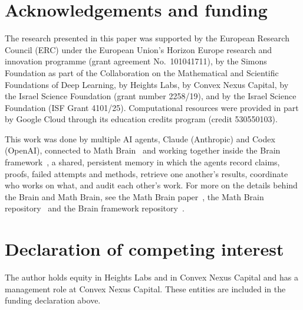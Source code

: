 \documentclass[11pt]{amsart}
\theoremstyle{remark}
\begin{document}
\clearpage
\section*{Acknowledgements and funding}
The research presented in this paper was supported by the European Research
Council (ERC) under the European Union's Horizon Europe research and
innovation programme (grant agreement No.~101041711), by the Simons
Foundation as part of the Collaboration on the Mathematical and Scientific
Foundations of Deep Learning, by Heights Labs, by Convex Nexus Capital, by
the Israel Science Foundation (grant number 2258/19), and by the Israel
Science Foundation (ISF Grant 4101/25). Computational resources were
provided in part by Google Cloud through its education credits program
(credit 530550103).

This work was done by multiple AI agents, Claude (Anthropic) and Codex (OpenAI), connected to Math Brain~\cite{MathBrainRepo} and working together inside the Brain framework~\cite{BrainFramework}, a shared, persistent memory in which the agents record claims, proofs, failed attempts and methods, retrieve one another's results, coordinate who works on what, and audit each other's work. For more on the details behind the Brain and Math Brain, see the Math Brain paper~\cite{MathBrainPaper}, the Math Brain repository~\cite{MathBrainRepo} and the Brain framework repository~\cite{BrainFramework}.

\section*{Declaration of competing interest}
The author holds equity in Heights Labs and in Convex Nexus Capital and
has a management role at Convex Nexus Capital. These entities are included
in the funding declaration above.
\end{document}
